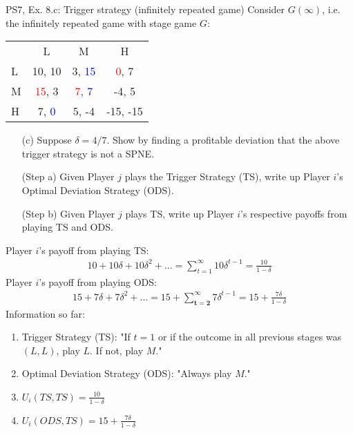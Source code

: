 \begin{frame}{PS7, Ex. 8.c: Trigger strategy (infinitely repeated game)}
    Consider $G(\infty)$, i.e. the infinitely repeated game with stage game $G$: \vspace{-6pt}
    \begin{table}
      \begin{tabular}{l|c|c|c|}
        \multicolumn{1}{c}{} & \multicolumn{1}{c}{L} & \multicolumn{1}{c}{M} & \multicolumn{1}{c}{H} \\\cline{2-4}
        L & 10, 10 & 3, \textcolor{blue}{15} & \textcolor{red}{0}, 7 \\\cline{2-4}
        M & \textcolor{red}{15}, 3 & \textcolor{red}{7}, \textcolor{blue}{7} & -4, 5 \\\cline{2-4}
        H & 7, \textcolor{blue}{0} & 5, -4 & -15, -15 \\\cline{2-4}
      \end{tabular}
    \end{table}
    \begin{itemize}
      \vspace{-4pt} \item[(c)] Suppose $\delta = 4/7$. Show by finding a profitable deviation that the above trigger strategy is not a SPNE. \vspace{-6pt}
    \end{itemize}
  \begin{multicols}{2}
    \begin{itemize}
      \item[(Step a)] Given Player $j$ plays the Trigger Strategy (TS), write up Player $i$'s Optimal Deviation Strategy (ODS).
      \item[(Step b)] Given Player $j$ plays TS, write up Player $i$'s respective payoffs from playing TS and ODS.
    \end{itemize}
    Player $i$'s payoff from playing TS:
    \vspace{-4pt}
    \begin{align*}
      10+10\delta+10\delta^2+...=\sum_{t=1}^\infty10\delta^{t-1}=\frac{10}{1-\delta}
    \end{align*}
    Player $i$'s payoff from playing ODS:
    \vspace{-4pt}
    \begin{align*}
      15+7\delta+7\delta^2+...=15+\sum_{\bm{t=2}}^\infty7\delta^{t-1}=15+\frac{7\delta}{1-\delta}
    \end{align*}
    \vfill\null\columnbreak
    Information so far:
    \begin{enumerate}
      \item Trigger Strategy (TS): "If $t=1$ or if the outcome in all previous stages was $(L,L)$, play $L$. If not, play $M$."
      \item Optimal Deviation Strategy (ODS): "Always play $M$."
      \item $U_i(TS,TS)=\frac{10}{1-\delta}$
      \item $U_i(ODS,TS)=15+\frac{7\delta}{1-\delta}$
    \end{enumerate}
    \vfill\null
  \end{multicols}
\end{frame}
